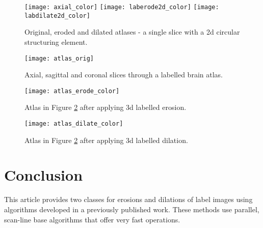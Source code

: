 \documentclass{InsightArticle}
\begin{document}
\begin{figure}[htbp]
\centering
\texttt{[image: axial\_color]}
\texttt{[image: laberode2d\_color]}
\texttt{[image: labdilate2d\_color]}
\caption{Original, eroded and dilated atlases - a single slice with a 2d circular structuring element.\label{fig:2d}}
\end{figure}

\begin{figure}[htbp]
\centering
\texttt{[image: atlas\_orig]}
\caption{Axial, sagittal and coronal slices through a labelled brain atlas.\label{fig:3dorig}}
\end{figure}

\begin{figure}[htbp]
\centering
\texttt{[image: atlas\_erode\_color]}
\caption{Atlas in Figure \ref{fig:3dorig} after applying 3d labelled erosion. \label{fig:3dero}}
\end{figure}

\begin{figure}[htbp]
\centering
\texttt{[image: atlas\_dilate\_color]}
\caption{Atlas in Figure \ref{fig:3dorig} after applying 3d labelled dilation. \label{fig:3ddil}}
\end{figure}



\section{Conclusion}
This article provides two classes for erosions and dilations of label
images using algorithms developed in a previously published
work. These methods use parallel, scan-line base algorithms that offer
very fast operations.


\nocite{ITKSoftwareGuide}
\end{document}

